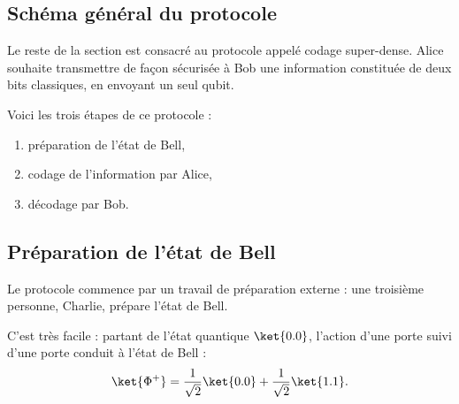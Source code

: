 \documentclass[11pt,class=report,crop=false]{standalone}
\begin{document}
%  
%  
%  



\subsection{Schéma général du protocole}

Le reste de la section est consacré au protocole appelé \og{}codage super-dense\fg{}.
Alice souhaite transmettre de façon sécurisée à Bob une information constituée de deux bits classiques, en envoyant un seul qubit.

Voici les trois étapes de ce protocole :
\begin{enumerate}
  \item préparation de l'état de Bell,
  \item codage de l'information par Alice,
  \item décodage par Bob.
\end{enumerate}


\subsection{Préparation de l'état de Bell}
Le protocole commence par un travail de préparation externe : une troisième personne, Charlie, prépare l'état de Bell. 

C'est très facile : partant de l'état quantique $\ket{0.0}$, l'action d'une porte  suivi d'une porte  conduit à l'état de Bell :
$$\ket{\Phi^+} = \frac1{\sqrt2} \ket{0.0} + \frac1{\sqrt2} \ket{1.1}.$$
\end{document}
